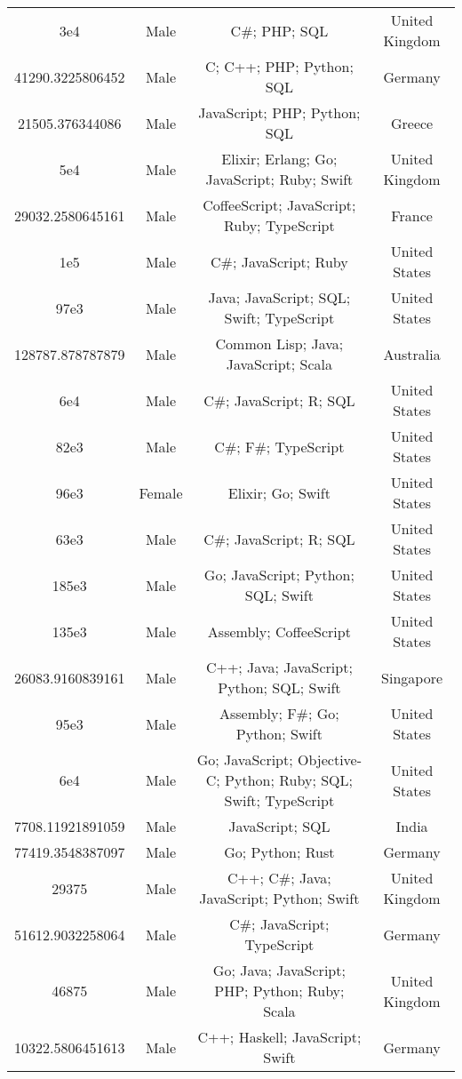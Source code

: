 \begin{center}
\begin{tabular}{ |c|c|c|c| }
3e4  &  Male  &  C\#; PHP; SQL  &  United Kingdom  \\ 
41290.3225806452  &  Male  &  C; C++; PHP; Python; SQL  &  Germany  \\ 
21505.376344086  &  Male  &  JavaScript; PHP; Python; SQL  &  Greece  \\ 
5e4  &  Male  &  Elixir; Erlang; Go; JavaScript; Ruby; Swift  &  United Kingdom  \\ 
29032.2580645161  &  Male  &  CoffeeScript; JavaScript; Ruby; TypeScript  &  France  \\ 
1e5  &  Male  &  C\#; JavaScript; Ruby  &  United States  \\ 
97e3  &  Male  &  Java; JavaScript; SQL; Swift; TypeScript  &  United States  \\ 
128787.878787879  &  Male  &  Common Lisp; Java; JavaScript; Scala  &  Australia  \\ 
6e4  &  Male  &  C\#; JavaScript; R; SQL  &  United States  \\ 
82e3  &  Male  &  C\#; F\#; TypeScript  &  United States  \\ 
96e3  &  Female  &  Elixir; Go; Swift  &  United States  \\ 
63e3  &  Male  &  C\#; JavaScript; R; SQL  &  United States  \\ 
185e3  &  Male  &  Go; JavaScript; Python; SQL; Swift  &  United States  \\ 
135e3  &  Male  &  Assembly; CoffeeScript  &  United States  \\ 
26083.9160839161  &  Male  &  C++; Java; JavaScript; Python; SQL; Swift  &  Singapore  \\ 
95e3  &  Male  &  Assembly; F\#; Go; Python; Swift  &  United States  \\ 
6e4  &  Male  &  Go; JavaScript; Objective-C; Python; Ruby; SQL; Swift; TypeScript  &  United States  \\ 
7708.11921891059  &  Male  &  JavaScript; SQL  &  India  \\ 
77419.3548387097  &  Male  &  Go; Python; Rust  &  Germany  \\ 
29375  &  Male  &  C++; C\#; Java; JavaScript; Python; Swift  &  United Kingdom  \\ 
51612.9032258064  &  Male  &  C\#; JavaScript; TypeScript  &  Germany  \\ 
46875  &  Male  &  Go; Java; JavaScript; PHP; Python; Ruby; Scala  &  United Kingdom  \\ 
10322.5806451613  &  Male  &  C++; Haskell; JavaScript; Swift  &  Germany  \\ 

\end{tabular}
\end{center}
